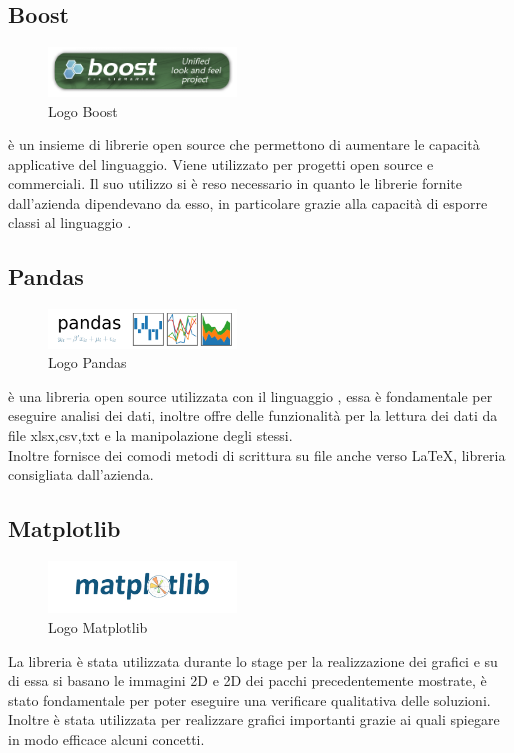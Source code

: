 \subsection{Boost}
\begin{figure}[H]
	\begin{center} \includegraphics[width=5cm]{figures/boost}
		\caption[Logo Boost]{Logo Boost}
	\end{center}
\end{figure}
 è un insieme di librerie  open source che permettono di aumentare le capacità applicative del linguaggio. Viene utilizzato per progetti open source e commerciali. Il suo utilizzo si è reso necessario in quanto le librerie fornite dall'azienda dipendevano da esso, in particolare grazie alla capacità di esporre classi  al linguaggio .

\subsection{Pandas}
\begin{figure}[H]
	\begin{center} \includegraphics[width=5cm]{figures/pandas_logo}
		\caption[Logo Pandas]{Logo Pandas}
	\end{center}
\end{figure}
 è una libreria open source utilizzata con il linguaggio , essa è fondamentale per eseguire analisi dei dati, inoltre offre delle funzionalità per la lettura dei dati da file xlsx,csv,txt e la manipolazione degli stessi. \\
Inoltre fornisce dei comodi metodi di scrittura su file anche verso \LaTeX, libreria consigliata dall'azienda.

\subsection{Matplotlib}
\begin{figure}[H]
	\begin{center} \includegraphics[width=5cm]{figures/matplotlib-1}
		\caption[Logo Matplotlib]{Logo Matplotlib}
	\end{center}
\end{figure}
La libreria  è stata utilizzata durante lo stage per la realizzazione dei grafici e su di essa si basano le immagini 2D e 2D dei pacchi precedentemente mostrate, è stato fondamentale per poter eseguire una verificare qualitativa delle soluzioni. Inoltre è stata utilizzata per realizzare grafici importanti grazie ai quali spiegare in modo efficace alcuni concetti.


